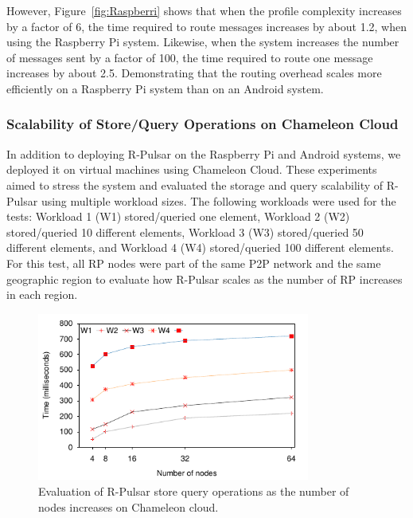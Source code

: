 However, Figure~\ref{fig:Raspberri} shows that when the profile complexity increases by a factor of 6, the time required to route messages increases by about 1.2, when using the Raspberry Pi system. Likewise, when the system increases the number of messages sent by a factor of 100, the time required to route one message increases by about 2.5. Demonstrating that the routing overhead scales more efficiently on a Raspberry Pi system than on an Android system.
\vspace{1ex}
\subsubsection{Scalability of Store/Query Operations on Chameleon Cloud}
\hfill\vspace{1ex}

In addition to deploying R-Pulsar on the Raspberry Pi and Android systems, we deployed it on virtual machines using Chameleon Cloud.
These experiments aimed to stress the system and evaluated the storage and query scalability of R-Pulsar using multiple workload sizes. The following workloads were used for the tests: Workload 1 (W1) stored/queried one element, Workload 2 (W2) stored/queried 10 different elements, Workload 3 (W3) stored/queried 50 different elements, and Workload 4 (W4) stored/queried 100 different elements. For this test, all RP nodes were part of the same P2P network and the same geographic region to evaluate how R-Pulsar scales as the number of RP increases in each region. 

\begin{figure}[h!]
  \includegraphics[width=0.8\textwidth]{Results/ProducerLine.pdf}
  \caption{Evaluation of R-Pulsar store query operations as the number of nodes increases on Chameleon cloud.}
  \label{fig:ProducerLine}
\end{figure}

